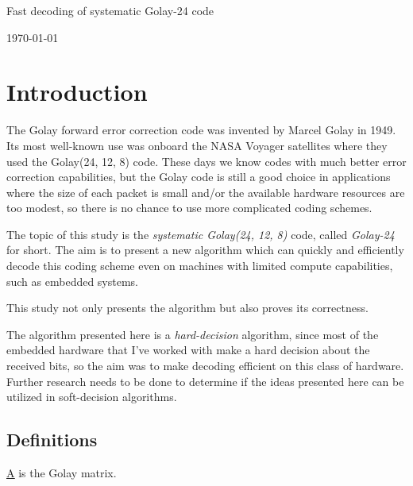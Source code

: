 \documentclass[11pt,a4paper,oneside]{report}             %
\def\doubleunderline#1{\underline{\underline{#1}}}
\begin{document}
\begin{titlepage}
\begin{center}
{\huge Fast decoding of systematic Golay-24 code } 
\vspace{0.5cm}

\vfill
{\large \today}
\end{center}
\end{titlepage}

\chapter{Introduction}

The Golay forward error correction code was invented by Marcel Golay in 1949. Its most well-known
use was onboard the NASA Voyager satellites where they used the Golay(24, 12, 8) code. These days
we know codes with much better error correction capabilities, but the Golay code is still a good
choice in applications where the size of each packet is small and/or the available hardware
resources are too modest, so there is no chance to use more complicated coding schemes.

The topic of this study is the \emph{systematic Golay(24, 12, 8)} code, called \emph{Golay-24} for short.
The aim is to present a new algorithm which can quickly and efficiently
decode this coding scheme even on machines with limited compute capabilities,
such as embedded systems.

This study not only presents the algorithm but also proves its correctness.

The algorithm presented here is a \emph{hard-decision} algorithm, since most of the embedded hardware
that I've worked with make a hard decision about the received bits, so the aim was to make decoding
efficient on this class of hardware.
Further research needs to be done to determine if the ideas presented here can be utilized in soft-decision algorithms.

\section{Definitions}

\doubleunderline{A} is the Golay matrix.
\end{document}
